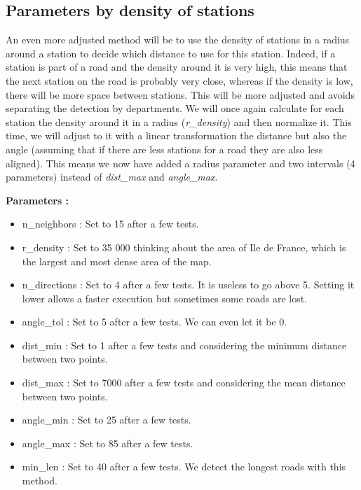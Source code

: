 \documentclass[main.tex]{subfiles}
\begin{document}
\subsection{Parameters by density of stations}

An even more adjusted method will be to use the density of stations in a radius around a station to decide which distance to use for this station. Indeed, if a station is part of a road and the density around it is very high, this means that the next station on the road is probably very close, whereas if the density is low, there will be more space between stations. This will be more adjusted and avoids separating the detection by departments. We will once again calculate for each station the density around it in a radius (\textit{r\_density}) and then normalize it. This time, we will adjust to it with a linear transformation the distance but also the angle (assuming that if there are less stations for a road they are also less aligned). This means we now have added a radius parameter and two intervals (4 parameters) instead of \textit{dist\_max} and \textit{angle\_max}.

\textbf{Parameters : }
\begin{itemize}
    \item n\_neighbors : Set to 15 after a few tests.
    \item r\_density : Set to 35 000 thinking about the area of Ile de France, which is the largest and most dense area of the map. 
    \item n\_directions : Set to 4 after a few tests. It is useless to go above 5. Setting it lower allows a faster execution but sometimes some roads are lost.
    \item angle\_tol : Set to 5 after a few tests. We can even let it be 0. 
    \item dist\_min : Set to 1 after a few tests and considering the minimum distance between two points.
    \item dist\_max : Set to 7000 after a few tests and considering the mean distance between two points.
    \item angle\_min : Set to 25 after a few tests.
    \item angle\_max : Set to 85 after a few tests.
    \item min\_len : Set to 40 after a few tests. We detect the longest roads with this method.
\end{itemize}
\end{document}
